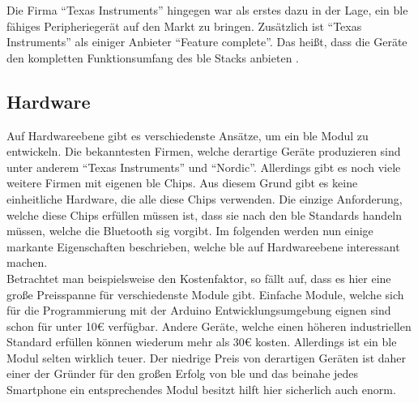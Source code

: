 \noindent Die Firma "`Texas Instruments"' hingegen war als erstes dazu in der Lage, ein \ac{ble} fähiges Peripheriegerät auf den Markt zu bringen. Zusätzlich ist "`Texas Instruments"' als einiger Anbieter "`Feature complete"'. Das heißt, dass die Geräte den kompletten Funktionsumfang des \ac{ble} Stacks anbieten \cite[Seite 79]{Townsend14:GSB}.\\ 

\subsection{Hardware}
\label{ss:grundlagen:hardware}

Auf Hardwareebene gibt es verschiedenste Ansätze, um ein \ac{ble} Modul zu entwickeln. Die bekanntesten Firmen, welche derartige Geräte produzieren sind unter anderem "`Texas Instruments"' und "`Nordic"'. Allerdings gibt es noch viele weitere Firmen mit eigenen \ac{ble} Chips. Aus diesem Grund gibt es keine einheitliche Hardware, die alle diese Chips verwenden. Die einzige Anforderung, welche diese Chips erfüllen müssen ist, dass sie nach den \ac{ble} Standards handeln müssen, welche die Bluetooth \ac{sig} vorgibt. Im folgenden werden nun einige markante Eigenschaften beschrieben, welche \ac{ble} auf Hardwareebene interessant machen.\\

\noindent Betrachtet man beispielsweise den Kostenfaktor, so fällt auf, dass es hier eine große Preisspanne für verschiedenste Module gibt. Einfache Module, welche sich für die Programmierung mit der Arduino Entwicklungsumgebung eignen sind schon für unter 10€ verfügbar. Andere Geräte, welche einen höheren industriellen Standard erfüllen können wiederum mehr als 30€ kosten. Allerdings ist ein \ac{ble} Modul selten wirklich teuer. Der niedrige Preis von derartigen Geräten ist daher einer der Gründer für den großen Erfolg von \ac{ble} und das beinahe jedes Smartphone ein entsprechendes Modul besitzt hilft hier sicherlich auch enorm.\\

